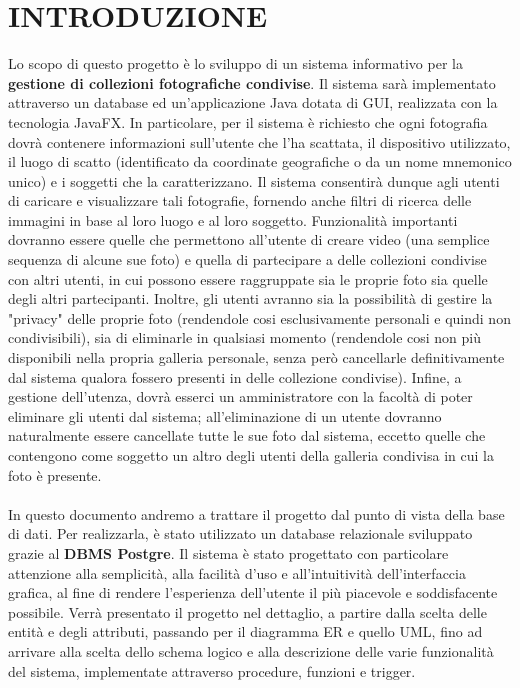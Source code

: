 \documentclass[a4paper]{article}
\begin{document}
\section{INTRODUZIONE}
\vspace{12pt}
	Lo scopo di questo progetto è lo sviluppo di un sistema
	informativo per la \textbf{gestione di collezioni
	fotografiche condivise}. Il sistema sarà
	implementato 
	attraverso un database ed un'applicazione Java
	dotata di GUI, realizzata con
	la tecnologia JavaFX. In particolare, per il sistema è
	richiesto che
	ogni fotografia
	dovrà contenere informazioni sull'utente che l'ha
	scattata, il dispositivo utilizzato, il luogo di scatto
	(identificato da coordinate geografiche o da un nome
	mnemonico unico) e i soggetti che la caratterizzano. Il
	sistema consentirà dunque agli utenti di caricare e
	visualizzare tali fotografie, fornendo
	anche filtri di ricerca delle immagini in base al
	loro luogo e al loro soggetto.
	Funzionalità importanti dovranno essere quelle che
	permettono
	all'utente di creare video
	(una semplice sequenza di alcune sue foto) e
	quella di partecipare a delle
	collezioni condivise con altri utenti, in cui possono
	essere raggruppate sia le proprie foto sia quelle degli
	altri partecipanti. Inoltre, gli utenti avranno sia la
	possibilità di gestire la "privacy" delle
	proprie foto (rendendole cosi esclusivamente personali e
	quindi non condivisibili), sia
	di eliminarle in qualsiasi momento (rendendole cosi
	non più disponibili nella propria galleria personale,
	senza
	però cancellarle definitivamente dal sistema qualora
	fossero presenti in delle collezione condivise). Infine,
	a
	gestione dell'utenza, dovrà esserci un amministratore con 
	la facoltà di poter eliminare gli utenti dal sistema;
	all'eliminazione di un utente dovranno naturalmente
	essere cancellate
	tutte le sue foto dal sistema, eccetto quelle che
	contengono come soggetto un altro degli utenti della
	galleria condivisa in cui la foto è presente.
	\\\\
	In questo documento andremo a trattare il progetto dal
	punto di vista della base di dati. Per realizzarla, è
	stato utilizzato un database relazionale sviluppato
	grazie al \textbf{DBMS Postgre}. Il sistema è stato
	progettato con
	particolare attenzione alla semplicità, alla
	facilità d'uso e
	all'intuitività dell'interfaccia grafica, al fine
	di
	rendere l'esperienza dell'utente il più piacevole e
	soddisfacente possibile. Verrà presentato il progetto nel
	dettaglio, a partire dalla scelta delle entità e degli
	attributi, passando per il diagramma ER e quello UML,
	fino ad arrivare alla scelta dello schema logico e alla
	descrizione delle varie funzionalità del sistema,
	implementate attraverso procedure, funzioni e
	trigger.
\end{document}
